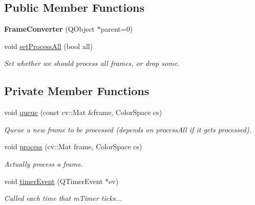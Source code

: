 \subsection*{Public Member Functions}
\begin{DoxyCompactItemize}
\item 
{\bfseries Frame\+Converter} (Q\+Object $\ast$parent=0)\hypertarget{classFrameConverter_a0595174e3dab848cb357564b66f28d88}{}\label{classFrameConverter_a0595174e3dab848cb357564b66f28d88}

\item 
void \hyperlink{classFrameConverter_a171ea454ecabf617e116fb0ed5263f2a}{set\+Process\+All} (bool all)\hypertarget{classFrameConverter_a171ea454ecabf617e116fb0ed5263f2a}{}\label{classFrameConverter_a171ea454ecabf617e116fb0ed5263f2a}

\begin{DoxyCompactList}\small\item\em Set whether we should process all frames, or drop some. \end{DoxyCompactList}\end{DoxyCompactItemize}
\subsection*{Private Member Functions}
\begin{DoxyCompactItemize}
\item 
void \hyperlink{classFrameConverter_a95b2b0e256b1122c62aa5efc2adc18cc}{queue} (const cv\+::\+Mat \&frame, Color\+Space cs)
\begin{DoxyCompactList}\small\item\em Queue a new frame to be processed (depends on process\+All if it gets processed). \end{DoxyCompactList}\item 
void \hyperlink{classFrameConverter_ae285bbb69f501ed42a0fbbd1be7d4951}{process} (cv\+::\+Mat frame, Color\+Space cs)
\begin{DoxyCompactList}\small\item\em Actually process a frame. \end{DoxyCompactList}\item 
void \hyperlink{classFrameConverter_a88ed7e731659ce5a05af923eba204ffd}{timer\+Event} (Q\+Timer\+Event $\ast$ev)
\begin{DoxyCompactList}\small\item\em Called each time that m\+Timer ticks... \end{DoxyCompactList}\end{DoxyCompactItemize}
